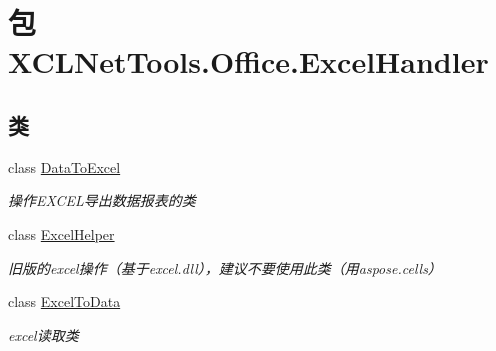 \hypertarget{namespace_x_c_l_net_tools_1_1_office_1_1_excel_handler}{\section{包 X\-C\-L\-Net\-Tools.\-Office.\-Excel\-Handler}
\label{namespace_x_c_l_net_tools_1_1_office_1_1_excel_handler}
}
\subsection*{类}
\begin{DoxyCompactItemize}
\item 
class \hyperlink{class_x_c_l_net_tools_1_1_office_1_1_excel_handler_1_1_data_to_excel}{Data\-To\-Excel}
\begin{DoxyCompactList}\small\item\em 操作\-E\-X\-C\-E\-L导出数据报表的类 \end{DoxyCompactList}\item 
class \hyperlink{class_x_c_l_net_tools_1_1_office_1_1_excel_handler_1_1_excel_helper}{Excel\-Helper}
\begin{DoxyCompactList}\small\item\em 旧版的excel操作（基于excel.\-dll），建议不要使用此类（用aspose.\-cells） \end{DoxyCompactList}\item 
class \hyperlink{class_x_c_l_net_tools_1_1_office_1_1_excel_handler_1_1_excel_to_data}{Excel\-To\-Data}
\begin{DoxyCompactList}\small\item\em excel读取类 \end{DoxyCompactList}\end{DoxyCompactItemize}
